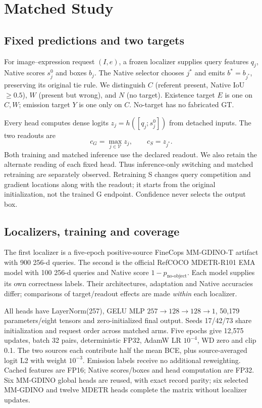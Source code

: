 \documentclass[10pt,twocolumn,letterpaper]{article}
\begin{document}
\section{Matched Study}
\subsection{Fixed predictions and two targets}
For image--expression request $(I,e)$, a frozen localizer supplies query
features $q_j$, Native scores $s_j^0$ and boxes $b_j$. The Native selector
chooses $j^*$ and emits $b^*=b_{j^*}$, preserving its original tie rule.
We distinguish $C$ (referent present, Native IoU $\geq0.5$), $W$ (present
but wrong), and $N$ (no target). Existence target $E$ is one on $C,W$;
emission target $Y$ is one only on $C$. No-target has no fabricated GT.

Every head computes dense logits $z_j=h([q_j;s_j^0])$ from detached
inputs. The two readouts are
\begin{equation}
c_G=\max_{j\in\mathcal V}z_j,\qquad c_S=z_{j^*}.
\end{equation}
Both training and matched inference use the declared readout. We also
retain the alternate reading of each fixed head. Thus inference-only
switching and matched retraining are separately observed. Retraining S
changes query competition and gradient locations along with the readout;
it starts from the original initialization, not the trained G endpoint.
Confidence never selects the output box.

\subsection{Localizers, training and coverage}
The first localizer is a five-epoch positive-source FineCops MM-GDINO-T
artifact with 900 256-d queries. The second is the official RefCOCO
MDETR-R101 EMA model with 100 256-d queries and Native score
$1-p_{\text{no-object}}$. Each model supplies its own correctness labels.
Their architectures, adaptation and Native accuracies differ; comparisons
of target/readout effects are made \emph{within} each localizer.

All heads have LayerNorm(257), GELU MLP
$257\!\rightarrow\!128\!\rightarrow\!128\!\rightarrow\!1$,
50,179 parameters/eight tensors and zero-initialized final output.
Seeds 17/42/73 share initialization and request order across matched arms.
Five epochs give 12,575 updates, batch 32 pairs, deterministic FP32,
AdamW LR $10^{-4}$, WD zero and clip 0.1. The two sources each contribute
half the mean BCE, plus source-averaged logit L2 with weight $10^{-3}$.
Emission labels receive no additional reweighting. Cached features are
FP16; Native scores/boxes and head computation are FP32. Six MM-GDINO
global heads are reused, with exact record parity; six selected MM-GDINO
and twelve MDETR heads complete the matrix without localizer updates.
\end{document}
